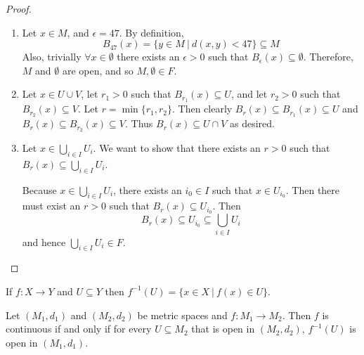 \begin{proof}
\begin{enumerate}
\item Let $x\in M$, and $\epsilon = 47$.  By definition,
\[B_{47} (x) = \{y\in M\ |\ d(x,y)<47\} \subseteq M\]
Also, trivially $\forall x\in \emptyset$ there exists an $\epsilon > 0$ such that $B_\epsilon (x) \subseteq \emptyset$.  Therefore, $M$ and $\emptyset$ are open, and so $M, \emptyset\in F$.

\item Let $x\in U\cup V$, let $r_1 >0$ such that $B_{r_1} (x) \subseteq U$, and let $r_2 >0$ such that $B_{r_2} (x) \subseteq V$.  Let $r = \min\{r_1, r_2 \}$.  Then clearly $B_r (x) \subseteq B_{r_1} (x) \subseteq U$ and $B_r (x) \subseteq B_{r_2} (x) \subseteq V$.  Thus  $B_r (x) \subseteq U \cap V$ as desired.

\item Let $x \in \bigcup_{i\in I} U_i$.  We want to show that there exists an $r>0$ such that $B_r (x) \subseteq \bigcup_{i\in I} U_i$.  

Because $x\in \bigcup_{i\in I} U_i$, there exists an $i_0 \in I$ such that $x\in U_{i_0}$.  Then there must exist an $r>0$ such that $B_r (x) \subseteq U_{i_0}$.  Then
\[B_r (x) \subseteq U_{i_0} \subseteq \bigcup_{i\in I} U_i\]
and hence $\bigcup_{i\in I} U_i\in F$.
\end{enumerate}
\end{proof}

\begin{definition}
If $f:X \to Y$ and $U \subseteq Y$ then $f^{-1} (U) = \{x\in X\ |\ f(x) \in U\}$.
\end{definition}

\begin{theorem}
Let $(M_1, d_1)$ and $(M_2, d_2)$ be metric spaces and $f: M_1 \to M_2$. Then $f$ is continuous if and only if for every $U \subseteq M_2$ that is open in $(M_2,
d_2)$, $f^{-1} (U)$ is open in $(M_1, d_1)$.
\end{theorem}

